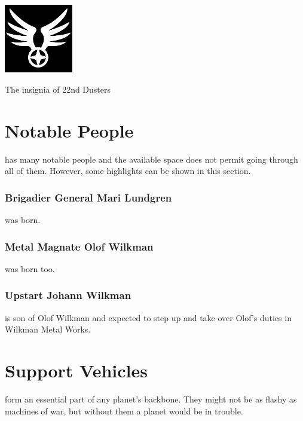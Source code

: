 \documentclass{tufte-book}
\begin{document}
\begin{marginfigure}[0\baselineskip]
  \includegraphics[width=3cm]{winged-emblem}
  \caption{The insignia of 22nd Dusters}
  \label{fig:dusters}
\end{marginfigure}

\chapter{Notable People}
\label{ch:notable-people}

 has many notable people and the available
space does not permit going through all of them. However, some highlights
can be shown in this section.

\subsection{Brigadier General Mari Lundgren}
\label{sc:bio-mari-lundgren}

 was born.

\subsection{Metal Magnate Olof Wilkman}
\label{sc:bio-olof-wilkman}

 was born too.

\subsection{Upstart Johann Wilkman}
\label{sc:bui.johann-wilkman}

 is son of Olof Wilkman and expected to step up
and take over Olof's duties in Wilkman Metal Works.

\chapter{Support Vehicles}
\label{ch:support-vehicles}


 form an essential part of any planet's
backbone. They might not be as flashy as machines of war, but without
them a planet would be in trouble.
\end{document}
